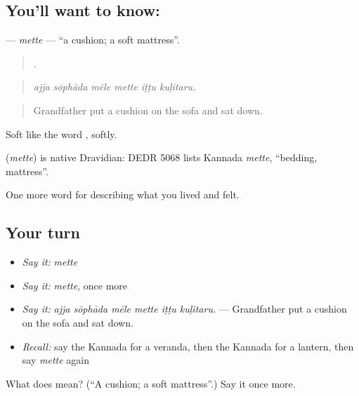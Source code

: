 \subsection*{You'll want to know: }
\textbf{} — \emph{mette} — \textquotedblleft{}a cushion; a soft mattress\textquotedblright{}.

\begin{quote}
     .
\end{quote}

\begin{quote}
\emph{ajja sōphāda mēle mette iṭṭu kuḷitaru.}
\end{quote}

\begin{quote}
Grandfather put a cushion on the sofa and sat down.
\end{quote}

Soft like the word , softly.

\begin{cousinweb}
\textbf{} (\emph{mette}) is native Dravidian: DEDR 5068 lists Kannada \emph{mette}, \textquotedblleft{}bedding, mattress\textquotedblright{}.
\end{cousinweb}

\begin{grammarlens}[title={What you've built}]
One more word for describing what you lived and felt.
\end{grammarlens}

\subsection*{Your turn}
\begin{itemize}
\raggedright
  \item \emph{Say it:} \emph{mette}
  \item \emph{Say it:} \emph{mette}, once more
  \item \emph{Say it:} \emph{ajja sōphāda mēle mette iṭṭu kuḷitaru.} — Grandfather put a cushion on the sofa and sat down.
  \item \emph{Recall:} say the Kannada for a veranda, then the Kannada for a lantern, then say \emph{mette} again
\end{itemize}

\begin{tcolorbox}[breakable,colback=teal!4,colframe=teal!35!black,title={Before you move on}]
What does  mean? (\textquotedblleft{}A cushion; a soft mattress\textquotedblright{}.) Say it once more.
\end{tcolorbox}
